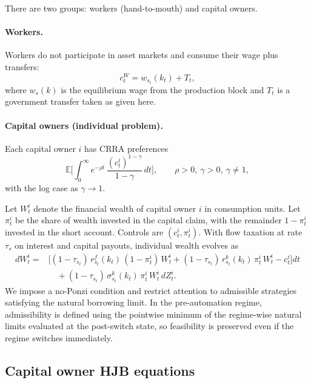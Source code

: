\documentclass{article}
\begin{document}
There are two groups: workers (hand-to-mouth) and capital owners.

\paragraph{Workers.}
Workers do not participate in asset markets and consume their wage plus transfers:
\begin{equation}\label{eq:worker_cons_hh}
c^W_t = w_{s_t}(k_t) + T_t,
\end{equation}
where $w_s(k)$ is the equilibrium wage from the production block and $T_t$ is a government transfer taken as given here.

\paragraph{Capital owners (individual problem).}
Each capital owner $i$ has CRRA preferences
\begin{equation}\label{eq:pref_hh}
\mathbb E\Big[\int_0^\infty e^{-\rho t}\,\frac{(c^i_t)^{1-\gamma}}{1-\gamma}\,dt\Big],
\qquad \rho>0,\ \gamma>0,\ \gamma\neq 1,
\end{equation}
with the log case as $\gamma\to 1$.

Let $W^i_t$ denote the financial wealth of capital owner $i$ in consumption units. Let $\pi^i_t$ be the share of wealth invested in the capital claim,
with the remainder $1-\pi^i_t$ invested in the short account. Controls are $(c^i_t,\pi^i_t)$.
With flow taxation at rate $\tau_s$ on interest and capital payouts, individual wealth evolves as
\begin{align}
dW^i_t
={}&\Big[(1-\tau_{s_t})\,r^f_{s_t}(k_t)\,(1-\pi^i_t)\,W^i_t
+(1-\tau_{s_t})\,r^k_{s_t}(k_t)\,\pi^i_t\,W^i_t
-c^i_t\Big]dt \nonumber\\
&\quad +(1-\tau_{s_t})\,\sigma^k_{s_t}(k_t)\,\pi^i_t\,W^i_t\,dZ^i_t. \label{eq:wealth_hh}
\end{align}
We impose a no-Ponzi condition and restrict attention to admissible strategies satisfying the natural borrowing limit.
In the pre-automation regime, admissibility is defined using the pointwise minimum of the regime-wise natural limits evaluated at the post-switch state,
so feasibility is preserved even if the regime switches immediately.

\subsection{Capital owner HJB equations}
\end{document}
